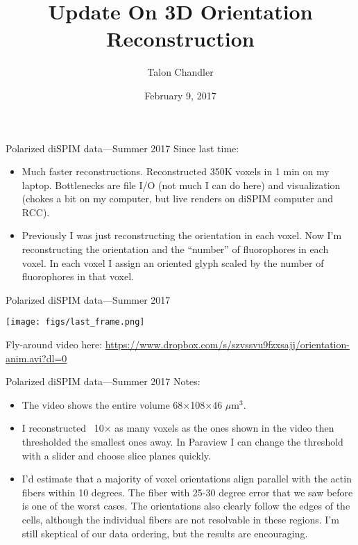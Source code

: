 \documentclass[presentation]{beamer}
\author{Talon Chandler}
\date{February 9, 2017}
\title{Update On 3D Orientation Reconstruction}
\begin{document}
\maketitle
\begin{frame}[label=sec-1]{Polarized diSPIM data---Summer 2017}
Since last time:
\begin{itemize}
\item Much faster reconstructions. Reconstructed 350K voxels in 1 min on my
  laptop. Bottlenecks are file I/O (not much I can do here) and visualization
  (chokes a bit on my computer, but live renders on diSPIM computer and RCC).
\item Previously I was just reconstructing the orientation in each voxel. Now
  I'm reconstructing the orientation and the ``number'' of fluorophores in each
  voxel. In each voxel I assign an oriented glyph scaled by the number of
  fluorophores in that voxel.
\end{itemize}
\end{frame}

\begin{frame}[label=sec-1]{Polarized diSPIM data---Summer 2017}
 \begin{center}
   \texttt{[image: figs/last\_frame.png]}
 \end{center}
  Fly-around video here: \url{https://www.dropbox.com/s/szvssvu9fzxsajj/orientation-anim.avi?dl=0}
\end{frame}

\begin{frame}[label=sec-1]{Polarized diSPIM data---Summer 2017}
Notes:
\begin{itemize}
\item The video shows the entire volume 68$\times$108$\times$46 $\mu$m${}^3$.
\item I reconstructed ~10$\times$ as many voxels as the ones shown in the video then
  thresholded the smallest ones away. In Paraview I can change the threshold
  with a slider and choose slice planes quickly. 
\item I'd estimate that a majority of voxel orientations align parallel with the
  actin fibers within 10 degrees. The fiber with 25-30 degree error that we saw
  before is one of the worst cases. The orientations also clearly follow the
  edges of the cells, although the individual fibers are not resolvable in these
  regions. I'm still skeptical of our data ordering, but the results are
  encouraging.
  \end{itemize}
\end{frame}
\end{document}
